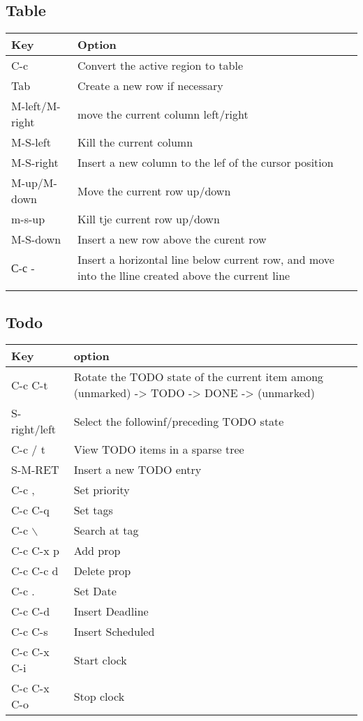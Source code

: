 \documentclass[11pt]{article}
\begin{document}
\subsection{Table}
\label{sec:org1c85244}
\begin{center}
\begin{tabular}{ll}
Key & Option\\
\hline
C-c & Convert the active region to table\\
Tab & Create a new row if necessary\\
M-left/M-right & move the current column   left/right\\
M-S-left & Kill the current column\\
M-S-right & Insert a new column to the lef of the cursor position\\
M-up/M-down & Move the current row up/down\\
m-s-up & Kill tje current row up/down\\
M-S-down & Insert a new row above the curent row\\
С-с - & Insert a horizontal line below current row, and move into the lline created above the current line\\
 & \\
\hline
\end{tabular}
\end{center}

\subsection{Todo}
\label{sec:org908ac8f}
\begin{center}
\begin{tabular}{ll}
Key & option\\
\hline
C-c C-t & Rotate the TODO state of the current item among (unmarked) -> TODO -> DONE -> (unmarked)\\
S-right/left & Select the followinf/preceding TODO state\\
C-c / t & View TODO items in a sparse tree\\
S-M-RET & Insert a new TODO entry\\
C-c , & Set priority\\
C-c C-q & Set tags\\
C-c $\backslash$ & Search at tag\\
C-c C-x p & Add prop\\
C-c C-c d & Delete prop\\
C-c . & Set Date\\
C-c C-d & Insert Deadline\\
C-c C-s & Insert Scheduled\\
C-c C-x C-i & Start clock\\
C-c C-x C-o & Stop clock\\
\hline
\end{tabular}
\end{center}
\end{document}

